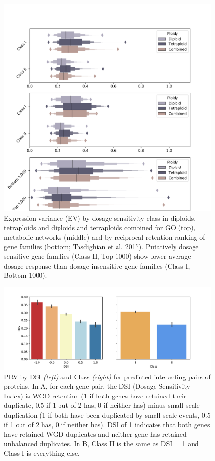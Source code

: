 \documentclass[11pt]{article}
\begin{document}
\begin{figure}[h!]
   \includegraphics[width=\linewidth]{../figures/EV_boxen.png}
\caption{Expression variance (EV) by dosage sensitivity class in diploids, tetraploids and diploids and tetraploids combined for GO (top), metabolic networks (middle) and by reciprocal retention ranking of gene families (bottom; Tasdighian et al. 2017). Putatively dosage sensitive gene families (Class II, Top 1000) show lower average dosage response than dosage insensitive gene families (Class I, Bottom 1000).}
 \label{fig5}
\end{figure}


\begin{figure}[h!]
   \includegraphics[width=\linewidth]{../figures/sppi.png}
\caption{PRV by DSI \textit{(left)} and Class \textit{(right)} for predicted interacting pairs of proteins. In A, for each gene pair, the DSI (Dosage Sensitivity Index) is WGD retention (1 if both genes have retained their duplicate, 0.5 if 1 out of 2 has, 0 if neither has) minus small scale duplication (1 if both have been duplicated by small scale events, 0.5 if 1 out of 2 has, 0 if neither has). DSI of 1 indicates that both genes have retained WGD duplicates and neither gene has retained unbalanced duplicates. In B, Class II is the same as DSI = 1 and Class I is everything else. %
}
 \label{fig6}
\end{figure}



\end{document}
